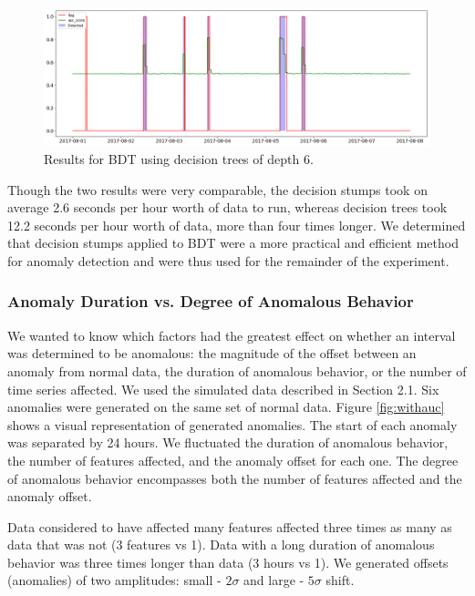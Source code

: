 \documentclass[5p]{elsarticle}
\begin{document}
\begin{figure}[htbp]
    \centering
    \includegraphics[width=\linewidth]{shaded-tree.png}
    \caption{Results for BDT using decision trees of depth 6.}
    \label{fig:shaded-tree}
\end{figure}

Though the two results were very comparable, the decision stumps took on average 2.6 seconds per hour worth of data to run, whereas decision trees took 12.2 seconds per hour worth of data, more than four times longer. We determined that decision stumps applied to BDT were a more practical and efficient method for anomaly detection and were thus used for the remainder of the experiment.

\subsubsection{Anomaly Duration vs. Degree of Anomalous Behavior}

We wanted to know which factors had the greatest effect on whether an interval was determined to be anomalous: the magnitude of the offset between an anomaly from normal data, the duration of anomalous behavior, or the number of time series affected. 
We used the simulated data described in Section 2.1. 
Six anomalies were generated on the same set of normal data. Figure \ref{fig:withauc} shows a visual representation of generated anomalies. 
The start of each anomaly was separated by 24 hours. We fluctuated the duration of anomalous behavior, the number of features affected, and the anomaly offset for each one. The degree of anomalous behavior encompasses both the number of features affected and the anomaly offset.

Data considered to have affected many features affected three times as many as data that was not (3 features vs 1). Data with a long duration of anomalous behavior was three times longer than data (3 hours vs 1). We generated offsets (anomalies) of two amplitudes: small - $2\sigma$ and large - $5\sigma$ shift. 
\end{document}
